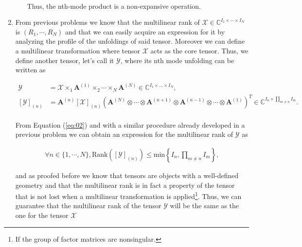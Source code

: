 \documentclass[a4paper,10pt]{article}
\begin{document}
\begin{enumerate}
\begin{enumerate}
            \paragraph{}Thus, the nth-mode product is a non-expansive operation.
            
        \end{enumerate}
        
    \item From previous problems we know that the multilinear rank of $\mathcal{X} \in \mathbb{C}^{I_{1} \times \cdots \times I_{N}}$ is $(R_{1}, \cdots, R_{N})$ and that we can easily acquire an expression for it by analyzing the profile of the unfoldings of said tensor. Moreover we can define a multilinear transformation where tensor $\mathcal{X}$ acts as the core tensor. Thus, we define another tensor, let's call it $\mathcal{Y}$, where its nth mode unfolding can be written as
        
        \begin{align}
            \mathcal{Y} &= \mathcal{X} \times_{1} \boldsymbol{A}^{(1)} \times_{2} \cdots \times_{N} \boldsymbol{A}^{(N)} \in \mathbb{C}^{I_{1} \times ... \times I_{N}}, \\
            \left[\mathcal{Y}\right]_{(n)} &= \boldsymbol{A}^{(n)} \left[\mathcal{X}\right]_{(n)} \left(\boldsymbol{A}^{(N)} \otimes \cdots \otimes \boldsymbol{A}^{(n+1)} \otimes \boldsymbol{A}^{(n-1)} \otimes \cdots \otimes \boldsymbol{A}^{(1)} \right)^{T} \in \mathbb{C}^{I_{n} \times \prod_{m \neq n} I_{m}}. \label{eq:02}
        \end{align}
    
        \paragraph{}From Equation (\ref{eq:02}) and with a similar procedure already developed in a previous problem we can obtain an expression for the multilinear rank of $\mathcal{Y}$ as
        
        \begin{align}
            \forall n \in \{1, \cdots, N\}, \text{Rank} \left( \left[\mathcal{Y}\right]_{(n)} \right) \leq \text{min} \left\{ I_{n}, \prod_{m \neq n} I_{m} \right\},
        \end{align}
        
        and as proofed before we know that tensors are objects with a well-defined geometry and that the multilinear rank is in fact a property of the tensor that is not lost when a multilinear transformation is applied\footnote{If the group of factor matrices are nonsingular.}. Thus, we can guarantee that the multilinear rank of the tensor $\mathcal{Y}$ will be the same as the one for the tensor $\mathcal{X}$


\end{enumerate}
\end{document}
